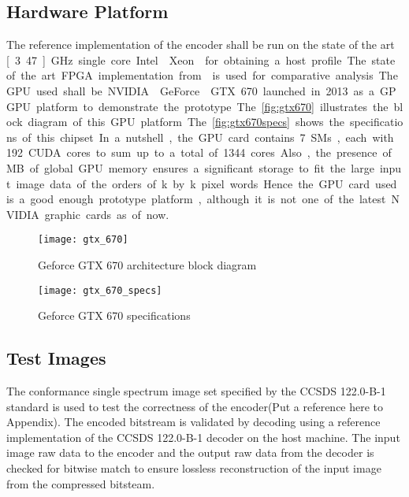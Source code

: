 \subsection{Hardware Platform}
The reference implementation of the encoder shall be run on the state of the art \unit[3.47]{GHz} single core Intel{\textregistered} Xeon{\texttrademark} for obtaining a host profile. The state of the art FPGA implementation from \cite{Manthey2014} is used for comparative analysis. The GPU used shall be NVIDIA{\textregistered} GeForce{\textregistered} GTX 670 launched in 2013 as a GPGPU platform to demonstrate the prototype. The \autoref{fig:gtx670} illustrates the block diagram of this \gls{GPU} platform. The \autoref{fig:gtx670specs} shows the specifications of this chipset. In a nutshell, the \gls{GPU} card contains 7 \glspl{SM}, each with 192 \gls{CUDA} cores to sum up to a total of 1344 cores. Also, the presence of \unit[2048]{MB} of global \gls{GPU} memory ensures a significant storage to fit the large input image data of the orders of \unit[16]{k} by \unit[32]{k} pixel words. Hence the \gls{GPU} card used is a good enough prototype platform, although it is not one of the latest NVIDIA graphic cards as of now.
\begin{figure}
    \centering
    \texttt{[image: gtx\_670]}\\
    \caption{Geforce GTX 670 architecture block diagram}\label{fig:gtx670}
\end{figure}
\begin{figure}
    \centering
    \texttt{[image: gtx\_670\_specs]}\\
    \caption{Geforce GTX 670 specifications}\label{fig:gtx670specs}
\end{figure}
\subsection{Test Images}
The conformance single spectrum image set specified by the \gls{CCSDS} 122.0-B-1 standard is used to test the correctness of the encoder(Put a reference here to Appendix). The encoded bitstream is validated by decoding using a reference implementation of the \gls{CCSDS} 122.0-B-1 decoder on the host machine. The input image raw data to the encoder and the output raw data from the decoder is checked for bitwise match to ensure lossless reconstruction of the input image from the compressed bitsteam.
